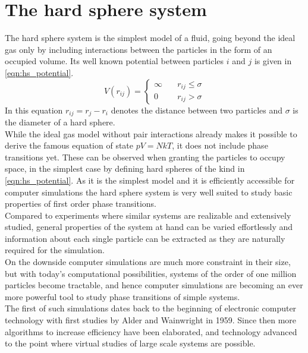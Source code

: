 
\label{chp:theory}

\section{The hard sphere system}
\label{sec:HS_system}
The hard sphere system is the simplest model of a fluid, going beyond the ideal gas only by including interactions between the particles in the form of an occupied volume. Its well known potential between particles $i$ and $j$ is given in \autoref{eqn:hs_potential}.
\begin{equation}
\label{eqn:hs_potential}
V(r_{ij})=%
\begin{cases}
\infty \quad & r_{ij} \le \sigma \\
0 \quad & r_{ij} > \sigma
\end{cases}
\end{equation}
In this equation $r_{ij} = r_j - r_i$ denotes the distance between two particles and $\sigma$ is the diameter of a hard sphere.\\

While the ideal gas model without pair interactions already makes it possible to derive the famous equation of state $pV=NkT$, it does not include phase transitions yet. These can be observed when granting the particles to occupy space, in the simplest case by defining hard spheres of the kind in \autoref{eqn:hs_potential}. As it is the simplest model and it is efficiently accessible for computer simulations the hard sphere system is very well suited to study basic properties of first order phase transitions.\\ 

Compared to experiments where similar systems are realizable and extensively studied, general properties of the system at hand can be varied effortlessly and information about each single particle can be extracted as they are naturally required for the simulation.\\

On the downside computer simulations are much more constraint in their size, but with today's computational possibilities, systems of the order of one million particles become tractable, and hence computer simulations are becoming an ever more powerful tool to study phase transitions of simple systems.\\

The first of such simulations dates back to the beginning of electronic computer technology with first studies by Alder and Wainwright in 1959\cite{Alders59}. Since then more algorithms to increase efficiency have been elaborated, and technology advanced to the point where virtual studies of large scale systems are possible.

